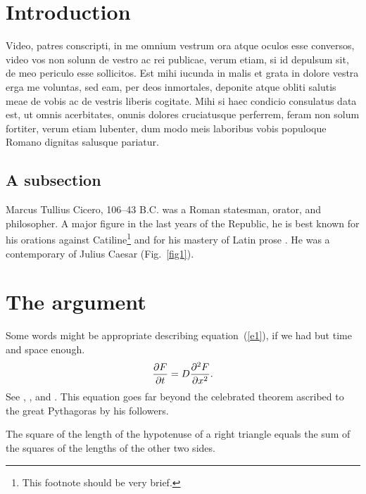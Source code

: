 \documentclass[twocolumn]{autart}    %
\begin{document}
\section{Introduction}
Video, patres conscripti, in me omnium vestrum ora atque oculos esse 
conversos, video vos non solunn de vestro ac rei publicae, verum 
etiam, si id depulsum sit, de meo periculo esse sollicitos. Est mihi 
iucunda in malis et grata in dolore vestra erga me voluntas, sed eam, 
per deos inmortales, deponite atque obliti salutis meae de vobis ac 
de vestris liberis cogitate. Mihi si haec condicio consulatus data 
est, ut omnis acerbitates, onunis dolores cruciatusque perferrem, 
feram non solum fortiter, verum etiam lubenter, dum modo meis 
laboribus vobis populoque Romano dignitas salusque pariatur.





\subsection{A subsection}
Marcus Tullius Cicero, 106--43 B.C. was a Roman statesman, orator, 
and philosopher.  A major figure in the last years of the Republic, 
he is best known for his orations against Catiline\footnote{
This footnote should be very brief.}
and for his mastery of Latin prose \cite{Heritage:92}. He was a 
contemporary of Julius Caesar (Fig.~\ref{fig1}).

\section{The argument}
Some words might be appropriate describing equation~(\ref{e1}), if 
we had but time and space enough.
\begin{equation} \label{e1}
{{\partial F}\over {\partial t}} =
D{{\partial^2 F}\over {\partial x^2}}.
\end{equation}
See \cite{Abl:56}, \cite{AbTaRu:54}, \cite{Keo:58} and 
\cite{Pow:85}.
This equation goes far beyond the celebrated theorem ascribed to the great
Pythagoras by his followers.
\begin{thm}
The square of the length of the hypotenuse of a right triangle equals the sum of the squares 
of the lengths of the other two sides.
\end{thm}
\end{document}
